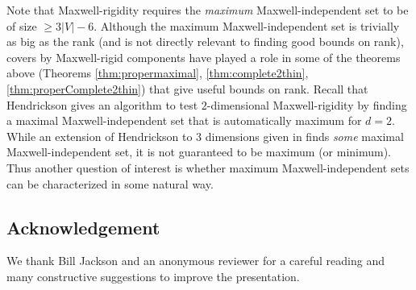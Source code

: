 \documentclass[10pt]{article}
\begin{document}
\medskip\noindent
Note that Maxwell-rigidity requires the {\it maximum} Maxwell-independent set to be of size $\geq 3|V|-6$. Although the maximum Maxwell-independent set is trivially as big as the rank (and is not directly relevant to finding good bounds on rank), covers by Maxwell-rigid components have played a role in some of the theorems above (Theorems \ref{thm:propermaximal}, \ref{thm:complete2thin}, \ref{thm:properComplete2thin}) that give useful bounds on rank. Recall that Hendrickson \cite{Hendrickson92conditionsfor} gives an algorithm to test $2$-dimensional Maxwell-rigidity by finding a maximal Maxwell-independent set that is automatically maximum for $d=2$. While an extension of Hendrickson \cite{Hendrickson92conditionsfor} to $3$ dimensions given in \cite{andrewThesis} finds {\em some} maximal Maxwell-independent set, it is not guaranteed to be maximum (or minimum). Thus another question of interest is whether maximum Maxwell-independent sets can be characterized in some natural way.



\subsection*{Acknowledgement}
We thank Bill Jackson and an anonymous reviewer for a careful reading and many constructive suggestions to improve the presentation.







\end{document}
